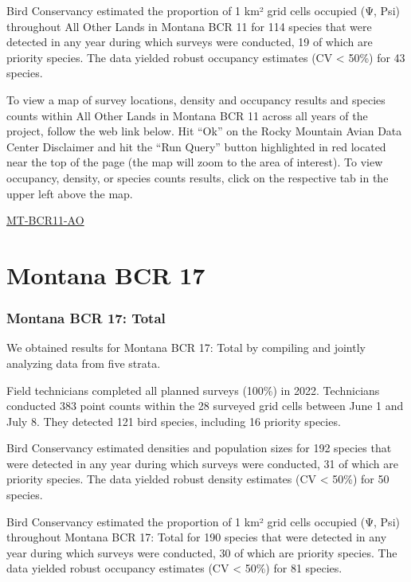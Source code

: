 \documentclass[
  letterpaper,
  DIV=11,
  numbers=noendperiod,
  oneside]{scrreprt}
\begin{document}
Bird Conservancy estimated the proportion of 1 km² grid cells occupied
(Ψ, Psi) throughout All Other Lands in Montana BCR 11 for 114 species
that were detected in any year during which surveys were conducted, 19
of which are priority species. The data yielded robust occupancy
estimates (CV \textless{} 50\%) for 43 species.

To view a map of survey locations, density and occupancy results and
species counts within All Other Lands in Montana BCR 11 across all years
of the project, follow the web link below. Hit ``Ok'' on the Rocky
Mountain Avian Data Center Disclaimer and hit the ``Run Query'' button
highlighted in red located near the top of the page (the map will zoom
to the area of interest). To view occupancy, density, or species counts
results, click on the respective tab in the upper left above the map.

\href{http://www.rmbo.org/new_site/adc/QueryWindow.aspx\#N4IgzgLgTghhCuBbEAuABCAsgFQLQCEBhAJQEZTcBBAeXUoBt61qIALAUyjQBkYA7ACZgQAXyA==}{MT-BCR11-AO}

\hypertarget{montana-bcr-17}{%
\section{Montana BCR 17}\label{montana-bcr-17}}

\hypertarget{montana-bcr-17-total}{%
\subsubsection{Montana BCR 17: Total}\label{montana-bcr-17-total}}

We obtained results for Montana BCR 17: Total by compiling and jointly
analyzing data from five strata.

Field technicians completed all planned surveys (100\%) in 2022.
Technicians conducted 383 point counts within the 28 surveyed grid cells
between June 1 and July 8. They detected 121 bird species, including 16
priority species.

Bird Conservancy estimated densities and population sizes for 192
species that were detected in any year during which surveys were
conducted, 31 of which are priority species. The data yielded robust
density estimates (CV \textless{} 50\%) for 50 species.

Bird Conservancy estimated the proportion of 1 km² grid cells occupied
(Ψ, Psi) throughout Montana BCR 17: Total for 190 species that were
detected in any year during which surveys were conducted, 30 of which
are priority species. The data yielded robust occupancy estimates (CV
\textless{} 50\%) for 81 species.
\end{document}
